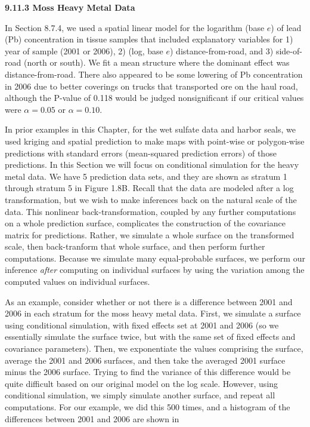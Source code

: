 \documentclass[12pt, titlepage]{article}
\begin{document}
\setcounter{equation}{0}
\renewcommand{\theequation}{R.\arabic{equation}}


%
%

{\large \flushleft \textbf{9.11.3 Moss Heavy Metal Data}}

\vspace{.3cm}

In Section 8.7.4, we used a spatial linear model for the logarithm (base $e$) of lead (Pb) concentration in tissue samples that included explanatory variables for 1) year of sample (2001 or 2006), 2) (log, base $e$) distance-from-road, and 3) side-of-road (north or south).  We fit a mean structure where the dominant effect was distance-from-road. There also appeared to be some lowering of Pb concentration in 2006 due to better coverings on trucks that transported ore on the haul road, although the P-value of 0.118 would be judged nonsignificant if our critical values were $\alpha = 0.05$ or $\alpha = 0.10$. 

In prior examples in this Chapter, for the wet sulfate data and harbor seals, we used kriging and spatial prediction to make maps with point-wise or polygon-wise predictions with standard errors (mean-squared prediction errors) of those predictions.  In this Section we will focus on conditional simulation for the heavy metal data.  We have 5 prediction data sets, and they are shown as stratum 1 through stratum 5 in Figure 1.8B.  Recall that the data are modeled after a log transformation, but we wish to make inferences back on the natural scale of the data.  This nonlinear back-transformation, coupled by any further computations on a whole prediction surface, complicates the construction of the covariance matrix for predictions.  Rather, we simulate a whole surface on the transformed scale, then back-tranform that whole surface, and then perform further computations.  Because we simulate many equal-probable surfaces, we perform our inference \textit{after} computing on individual surfaces by using the variation among the computed values on individual surfaces.

As an example, consider whether or not there is a difference between 2001 and 2006 in each stratum for the moss heavy metal data.  First, we simulate a surface using conditional simulation, with fixed effects set at 2001 and 2006 (so we essentially simulate the surface twice, but with the same set of fixed effects and covariance parameters).  Then, we exponentiate the values comprising the surface, average the 2001 and 2006 surfaces, and then take the averaged 2001 surface minus the 2006 surface.  Trying to find the variance of this difference would be quite difficult based on our original model on the log scale.  However, using conditional simulation, we simply simulate another surface, and repeat all computations.  For our example, we did this 500 times, and a histogram of the differences between 2001 and 2006 are shown in 
\end{document}
